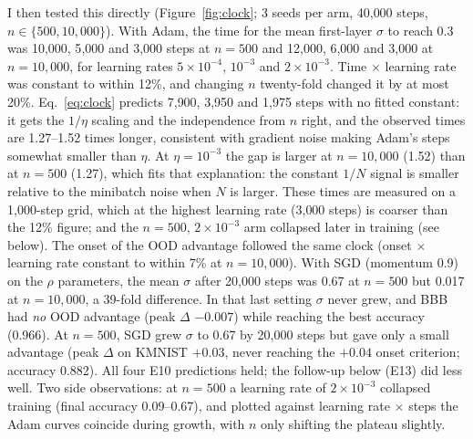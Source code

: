 \documentclass[11pt]{article}
\begin{document}
I then tested this directly (Figure~\ref{fig:clock}; 3 seeds per arm, 40{,}000
steps, $n\in\{500, 10{,}000\}$). With Adam, the time for the mean first-layer
$\sigma$ to reach 0.3 was 10{,}000, 5{,}000 and 3{,}000 steps at $n=500$ and
12{,}000, 6{,}000 and 3{,}000 at $n=10{,}000$, for learning rates
$5\times10^{-4}$, $10^{-3}$ and $2\times10^{-3}$. Time $\times$ learning rate was
constant to within 12\%, and changing $n$ twenty-fold changed it by at most
20\%. Eq.~\ref{eq:clock} predicts 7{,}900, 3{,}950 and 1{,}975 steps with no
fitted constant: it gets the $1/\eta$ scaling and the independence from $n$
right, and the observed times are 1.27--1.52 times longer, consistent with
gradient noise making Adam's steps somewhat smaller than $\eta$. At
$\eta=10^{-3}$ the gap is larger at $n=10{,}000$ (1.52) than at $n=500$ (1.27),
which fits that explanation: the constant $1/N$ signal is smaller relative to
the minibatch noise when $N$ is larger. These times are measured on a 1{,}000-step grid, which at the highest
learning rate (3{,}000 steps) is coarser than the 12\% figure; and the
$n=500$, $2\times10^{-3}$ arm collapsed later in training (see below). The onset of the OOD advantage followed the same clock (onset $\times$
learning rate constant to within 7\% at $n=10{,}000$). With SGD (momentum 0.9)
on the $\rho$ parameters, the mean $\sigma$ after 20{,}000 steps was 0.67 at
$n=500$ but 0.017 at $n=10{,}000$, a 39-fold difference. In that last setting
$\sigma$ never grew, and BBB had \emph{no} OOD advantage (peak $\Delta$ $-0.007$)
while reaching the best accuracy (0.966). At $n=500$, SGD grew $\sigma$ to 0.67 by
20{,}000 steps but gave only a small advantage (peak $\Delta$ on KMNIST $+0.03$,
never reaching the $+0.04$ onset criterion; accuracy 0.882). All four E10
predictions held; the follow-up below (E13) did less well. Two side observations: at $n=500$ a learning rate of $2\times10^{-3}$
collapsed training (final accuracy 0.09--0.67), and plotted against learning
rate $\times$ steps the Adam curves coincide during growth, with $n$ only
shifting the plateau slightly.
\end{document}
